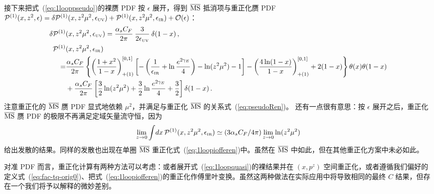 \begin{widetext}
接下来把式~(\ref{eq:1looppseudo})的裸赝 PDF 按 $\epsilon$ 展开，得到 $\overline{\rm MS}$ 抵消项与重正化赝 PDF ${\cal P}^{(1)} (x,z^2,\epsilon)= \delta {\cal P}^{(1)} (x,z^2\mu^2,\epsilon_{\mbox{\tiny UV}})+{\cal P}^{(1)} (x,z^2\mu^2,\epsilon_{\mbox{\tiny IR}})+{\cal O}(\epsilon)$：
\begin{align}\label{eq:1looppseudopdfb}
\delta {\cal P}^{(1)} &(x,z^2\mu^2,\epsilon_{\mbox{\tiny UV}})
	= {\alpha_sC_F\over 2\pi}\:
    {3\over 2\epsilon_{\mbox{\tiny UV}}} \: \delta(1-x)
  \,, \\
{\cal P}^{(1)} &(x,z^2\mu^2,\epsilon_{\mbox{\tiny IR}})
\nonumber\\
	=&{\alpha_sC_F\over 2\pi}\left\{\left({1+x^2\over 1-x}\right)^{[0,1]}_{+(1)}\left[- \left({1\over \epsilon_{\mbox{\tiny IR}}}+\ln{e^{2\gamma_E}\over 4}\right)-\ln(z^2 \mu^2)-1\right] - \left(4\ln(1-x)\over 1-x\right)^{[0,1]}_{+(1)}  +2(1-x)\right\}\theta(x)\theta(1-x)\nonumber\\
	&  +{\alpha_sC_F\over 2\pi}\left[{3\over2}\ln(z^2\mu^2) + {3\over2}\ln{e^{2\gamma_E}\over 4}+{3\over2}\right]\delta(1-x)
 \,.\nonumber
\end{align}
注意重正化的 $\overline{\rm MS}$ 赝 PDF 显式地依赖 $\mu^2$，并满足与重正化 $\overline{\rm MS}$ \spcorr 的关系式~(\ref{eq:pseudoRen})。
还有一点很有意思：按 $\epsilon$ 展开之后，重正化 $\overline{\rm MS}$ 赝 PDF 的极限不再满足定域矢量流守恒，因为
\begin{align} \label{eq:Ppdfconsrv}
\lim_{z\to 0} \int\! dx \, {\cal P}^{(1)} (x,z^2\mu^2,\epsilon_{\mbox{\tiny IR}}) \simeq (3\alpha_s C_F/4\pi) \lim_{z\to 0} \ln(z^2\mu^2)
\end{align}
给出发散的结果。同样的发散也出现在单圈 $\overline{\rm MS}$ 重正化\spcorr 式~(\ref{eq:1loopiofferen})中。虽然在 $\overline{\rm MS}$ 中如此，但在其他重正化方案中未必如此。

对准 PDF 而言，重正化计算有两种方法可以考虑：或者展开式~(\ref{eq:1loopquasi})的裸结果并在 $(x,p^z)$ 空间重正化，或者遵循我们偏好的定义式~(\ref{eq:fac-tq-orig0})、把式~(\ref{eq:1loopiofferen})的重正化\spcorr 作傅里叶变换。虽然这两种做法在实际应用中将导致相同的最终 $C$ 结果，但存在一个我们将予以解释的微妙差别。


\end{widetext}
